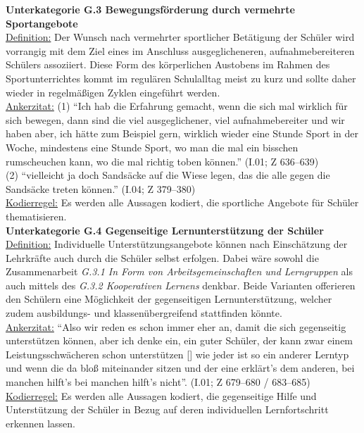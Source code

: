 \noindent
\textbf{Unterkategorie G.3 Bewegungsförderung durch vermehrte Sportangebote}\\
\underline{Definition:} Der Wunsch nach vermehrter sportlicher Betätigung der Schüler wird vorrangig mit dem Ziel eines im Anschluss ausgeglicheneren, aufnahmebereiteren Schülers assoziiert. Diese Form des körperlichen Austobens im Rahmen des Sportunterrichtes kommt im regulären Schulalltag meist zu kurz und sollte daher wieder in regelmäßigen Zyklen eingeführt werden.\\
\underline{Ankerzitat:} (1) "`Ich hab die Erfahrung gemacht, wenn die sich mal wirklich für sich bewegen, dann sind die viel ausgeglichener, viel aufnahmebereiter und wir haben aber, ich hätte zum Beispiel gern, wirklich wieder eine Stunde Sport in der Woche, mindestens eine Stunde Sport, wo man die mal ein bisschen rumscheuchen kann, wo die mal richtig toben können."' (I.01; Z 636--639)\\ (2) "`vielleicht ja doch Sandsäcke auf die Wiese legen, das die alle gegen die Sandsäcke treten können."' (I.04; Z 379--380)\\
\underline{Kodierregel:} Es werden alle Aussagen kodiert, die sportliche Angebote für Schüler thematisieren.\\

\noindent
\textbf{Unterkategorie G.4 Gegenseitige Lernunterstützung der Schüler}\\
\underline{Definition:} Individuelle Unterstützungsangebote können nach Einschätzung der Lehrkräfte auch durch die Schüler selbst erfolgen. Dabei wäre sowohl die Zusammenarbeit \textit{G.3.1 In Form von Arbeitsgemeinschaften und Lerngruppen} als auch mittels des \textit{G.3.2 Kooperativen Lernens} denkbar. Beide Varianten offerieren den Schülern eine Möglichkeit der gegenseitigen Lernunterstützung, welcher zudem ausbildungs- und klassenübergreifend stattfinden könnte.\\
\underline{Ankerzitat:} "`Also wir reden es schon immer eher an, damit die sich gegenseitig unterstützen können, aber ich denke ein, ein guter Schüler, der kann zwar einem Leistungsschwächeren schon unterstützen [\punkte] wie jeder ist so ein anderer Lerntyp und wenn die da bloß miteinander sitzen und der eine erklärt's dem anderen, bei manchen hilft's bei manchen hilft's nicht"'. (I.01; Z 679--680 / 683--685)\\
\underline{Kodierregel:} Es werden alle Aussagen kodiert, die gegenseitige Hilfe und Unterstützung der Schüler in Bezug auf deren individuellen Lernfortschritt erkennen lassen.\\

